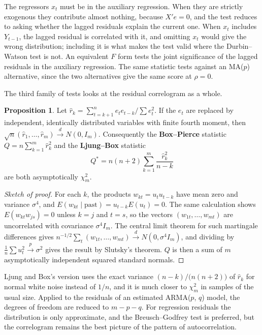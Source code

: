 \documentclass[11pt,a4paper]{article}
\numberwithin{equation}{section}
\theoremstyle{definition}
\newtheorem{prop}[thm]{Proposition}
\begin{document}
The regressors $x_t$ must be in the auxiliary regression. When they are strictly exogenous they contribute almost nothing, because $X'e = 0$, and the
test reduces to asking whether the lagged residuals explain the current one. When $x_t$ includes $Y_{t-1}$, the lagged residual is correlated with it,
and omitting $x_t$ would give the wrong distribution; including it is what makes the test valid where the Durbin--Watson test is not. An equivalent
$F$ form tests the joint significance of the lagged residuals in the auxiliary regression. The same statistic tests against an MA($p$) alternative, since
the two alternatives give the same score at $\rho = 0$.

The third family of tests looks at the residual correlogram as a whole.

\begin{prop}
\label{prop:ljungbox}
Let $\hat r_k = \sum_{t=k+1}^ne_te_{t-k}/\sum e_t^2$. If the $e_t$ are replaced by independent, identically distributed variables with finite fourth
moment, then $\sqrt n(\hat r_1, \dots, \hat r_m) \xrightarrow{d} N(0, I_m)$. Consequently the \textbf{Box--Pierce} statistic $Q = n\sum_{k=1}^m\hat r_k^2$ and the
\textbf{Ljung--Box} statistic
\[
Q^* = n(n + 2)\sum_{k=1}^m\frac{\hat r_k^2}{n - k}
\]
are both asymptotically $\chi^2_m$.
\end{prop}

\begin{proof}[Sketch of proof]
For each $k$, the products $w_{kt} = u_tu_{t-k}$ have mean zero and variance $\sigma^4$, and $E(w_{kt} \mid \text{past}) = u_{t-k}E(u_t) = 0$. The same
calculation shows $E(w_{kt}w_{js}) = 0$ unless $k = j$ and $t = s$, so the vectors $(w_{1t}, \dots, w_{mt})$ are uncorrelated with covariance $\sigma^4I_m$. The central
limit theorem for such martingale differences gives $n^{-1/2}\sum_t(w_{1t}, \dots, w_{mt}) \xrightarrow{d} N(0, \sigma^4I_m)$, and dividing by $\frac1n\sum u_t^2 \xrightarrow{p} \sigma^2$ gives the result by
Slutsky's theorem. $Q$ is then a sum of $m$ asymptotically independent squared standard normals.
\end{proof}

Ljung and Box's version uses the exact variance $(n - k)/\bigl(n(n + 2)\bigr)$ of $\hat r_k$ for normal white noise instead of $1/n$, and it is much closer
to $\chi^2_m$ in samples of the usual size. Applied to the residuals of an estimated ARMA($p$, $q$) model, the degrees of freedom are reduced to
$m - p - q$. For regression residuals the distribution is only approximate, and the Breusch--Godfrey test is preferred, but the correlogram
remains the best picture of the pattern of autocorrelation.
\end{document}
